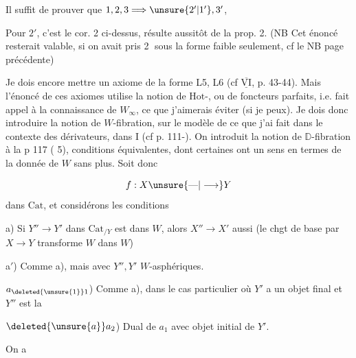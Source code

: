 Il suffit de prouver que $1,2,3\Longrightarrow\unsure{2'|1'},3'$,


Pour $2'$, c'est le cor. 2 ci-dessus,  résulte aussitôt de la prop. 2. (NB Cet énoncé resterait valable, si on avait pris \textcircled{2} sous la forme faible seulement, cf le NB page précédente)

Je dois encore mettre un axiome de la forme L5, L6 (cf $\overline{\underline{\mathrm{VI}}}$, p. 43-44). Mais l'énoncé de ces axiomes utilise la notion de $\mathrm{Hot}$-, ou de  foncteurs parfaits, i.e. fait appel à la connaissance de $W_\infty$, ce que j'aimerais éviter (si je peux). Je dois donc introduire la notion de $W$-fibration, sur le modèle de ce que j'ai fait dans le contexte des dérivateurs, dans I (cf p. 111-). On introduit la notion de $\mathbb{D}$-fibration à la p 117 ( 5),  conditions équivalentes, dont certaines ont un sens en termes de la donnée de $W$ sans plus. Soit donc 

\[
f:X\unsure{\text{---}|\longrightarrow}Y
\]
 dans $\mathrm{Cat}$, et considérons les conditions

a) Si $Y''\longrightarrow Y'$ dans $\mathrm{Cat}_{/Y}$ est dans $W$, alors $X''\longrightarrow X'$ aussi (le chgt de base par $X\longrightarrow Y$ transforme $W$ dans $W$)

a$'$) Comme a), mais avec $Y'',Y'$ $W$-asphériques.

$a_{\deleted{\unsure{1}}1}$) Comme a), dans le cas particulier où $Y'$ a un objet final  et $Y''$  est la  

$\deleted{\unsure{a}}a_2$) Dual de $a_1$ avec objet initial de $Y'$.

On a 

